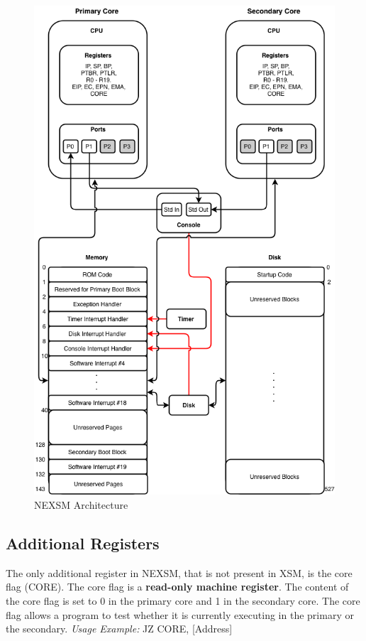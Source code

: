 \documentclass[12pt]{report}
\begin{document}
\begin{figure}
    \centering
    \includegraphics[scale=0.6]{nexsm_arch.png}
    \caption{NEXSM Architecture}
    \label{nexsm_arch}
\end{figure}

\subsection{Additional Registers}
The only additional register in NEXSM, that is not present in XSM, is the core flag (CORE). The core flag is a \textbf{read-only machine register}. The content of the core flag is set to 0 in the primary core and 1 in the secondary core. The core flag allows a program to test whether it is currently executing in the primary or the secondary.
\newline
\emph{Usage Example:} JZ CORE, [Address]
\end{document}
